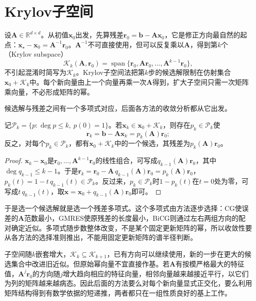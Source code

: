 \section{Krylov子空间}
\label{sec:ls-krylov-subspaces}

设$\bm A\in\mathbb R^{d\times d}$。从初值$\bm x_0$出发，先算残差$\bm r_0=\bm b-\bm A\bm x_0$，它是修正方向最自然的起点：$\bm x_\star-\bm x_0=\bm A^{-1}\bm r_0$。$\bm A^{-1}$不可直接使用，但可以反复乘以$\bm A$，得到第$k$个（Krylov subspace）
\[
 \mathcal K_k(\bm A,\bm r_0)=\operatorname{span}\{\bm r_0,\bm A\bm r_0,\ldots,\bm A^{k-1}\bm r_0\},
\]
不引起混淆时简写为$\mathcal K_k$。Krylov子空间法把第$k$步的候选解限制在仿射集合$\bm x_0+\mathcal K_k$中。每个新向量由上一个向量再乘一次$\bm A$得到，扩大子空间只需一次矩阵乘向量，不必形成矩阵的幂。

候选解与残差之间有一个多项式对应，后面各方法的收敛分析都从它出发。

\begin{lemma}[Krylov残差多项式]
\label{lem:ls-krylov-residual-polynomial}
记$\mathcal P_k=\{p:\deg p\le k,\ p(0)=1\}$。若$\bm x_k\in\bm x_0+\mathcal K_k$，则存在$p_k\in\mathcal P_k$使
\begin{equation}
 \label{eq:ls-krylov-residual-polynomial}
 \bm r_k=\bm b-\bm A\bm x_k=p_k(\bm A)\bm r_0 ;
\end{equation}
反之，对每个$p_k\in\mathcal P_k$，都有$\bm x_0+\mathcal K_k$中的一个候选，其残差为$p_k(\bm A)\bm r_0$。
\end{lemma}

\begin{proof}
$\bm x_k-\bm x_0$是$\bm r_0,\ldots,\bm A^{k-1}\bm r_0$的线性组合，可写成$q_{k-1}(\bm A)\bm r_0$，其中$\deg q_{k-1}\le k-1$。于是$\bm r_k=\bm r_0-\bm A\,q_{k-1}(\bm A)\bm r_0=p_k(\bm A)\bm r_0$，$p_k(t)=1-t\,q_{k-1}(t)\in\mathcal P_k$。反过来，$p_k\in\mathcal P_k$时$1-p_k(t)$在$t=0$处为零，可写成$t\,q_{k-1}(t)$，取$\bm x=\bm x_0+q_{k-1}(\bm A)\bm r_0$即可。
\end{proof}

于是选一个候选解就是选一个残差多项式。这个多项式由方法逐步选择：CG使误差的$\bm A$范数最小，GMRES使原残差的长度最小，BiCG则通过左右两组方向的配对确定近似。多项式随步数整体改变，不是某个固定更新矩阵的幂，所以收敛性要从各方法的选择准则推出，不能用固定更新矩阵的谱半径判断。

子空间随$k$嵌套增大，$\mathcal K_k\subseteq\mathcal K_{k+1}$，已有方向可以继续使用，新的一步在更大的候选集合中改进旧近似。但原始幂向量不宜直接作基。若$\bm A$有按模严格最大的特征值，$\bm A^j\bm r_0$的方向随$j$增大趋向相应的特征向量，相邻向量越来越接近平行，以它们为列的矩阵越来越病态。因此后面的方法要么对每个新向量显式正交化，要么利用矩阵结构得到有数学依据的短递推，两者都只在一组性质良好的基上工作。

